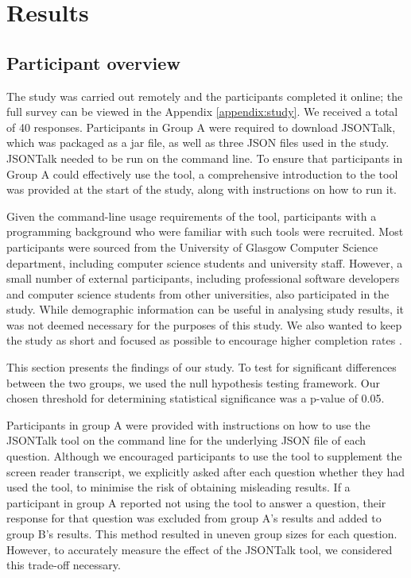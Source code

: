 \documentclass{l4proj}
\begin{document}
\section{Results}


\subsection{Participant overview}

The study was carried out remotely and the participants completed it online; the full survey can be viewed in the Appendix \ref{appendix:study}. We received a total of 40 responses. Participants in Group A were required to download JSONTalk, which was packaged as a jar file, as well as three JSON files used in the study. JSONTalk needed to be run on the command line. To ensure that participants in Group A could effectively use the tool, a comprehensive introduction to the tool was provided at the start of the study, along with instructions on how to run it.

Given the command-line usage requirements of the tool, participants with a programming background who were familiar with such tools were recruited. Most participants were sourced from the University of Glasgow Computer Science department, including computer science students and university staff. However, a small number of external participants, including professional software developers and computer science students from other universities, also participated in the study. While demographic information can be useful in analysing study results, it was not deemed necessary for the purposes of this study. We also wanted to keep the study as short and focused as possible to encourage higher completion rates \cite{deutskens2004response}.

This section presents the findings of our study. To test for significant differences between the two groups, we used the null hypothesis testing framework. Our chosen threshold for determining statistical significance was a p-value of 0.05.



Participants in group A were provided with instructions on how to use the JSONTalk tool on the command line for the underlying JSON file of each question. Although we encouraged participants to use the tool to supplement the screen reader transcript, we explicitly asked after each question whether they had used the tool, to minimise the risk of obtaining misleading results. If a participant in group A reported not using the tool to answer a question, their response for that question was excluded from group A's results and added to group B's results. This method resulted in uneven group sizes for each question. However, to accurately measure the effect of the JSONTalk tool, we considered this trade-off necessary.
\end{document}
